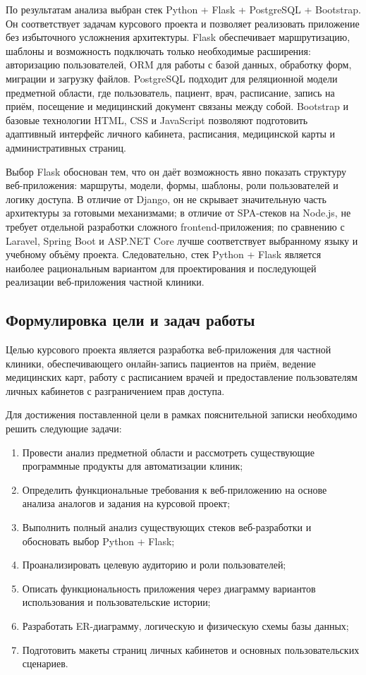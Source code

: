 По результатам анализа выбран стек Python + Flask + PostgreSQL + Bootstrap. Он соответствует задачам курсового проекта и позволяет реализовать приложение без избыточного усложнения архитектуры. Flask обеспечивает маршрутизацию, шаблоны и возможность подключать только необходимые расширения: авторизацию пользователей, ORM для работы с базой данных, обработку форм, миграции и загрузку файлов. PostgreSQL подходит для реляционной модели предметной области, где пользователь, пациент, врач, расписание, запись на приём, посещение и медицинский документ связаны между собой. Bootstrap и базовые технологии HTML, CSS и JavaScript позволяют подготовить адаптивный интерфейс личного кабинета, расписания, медицинской карты и административных страниц.

Выбор Flask обоснован тем, что он даёт возможность явно показать структуру веб-приложения: маршруты, модели, формы, шаблоны, роли пользователей и логику доступа. В отличие от Django, он не скрывает значительную часть архитектуры за готовыми механизмами; в отличие от SPA-стеков на Node.js, не требует отдельной разработки сложного frontend-приложения; по сравнению с Laravel, Spring Boot и ASP.NET Core лучше соответствует выбранному языку и учебному объёму проекта. Следовательно, стек Python + Flask является наиболее рациональным вариантом для проектирования и последующей реализации веб-приложения частной клиники.

\subsection{Формулировка цели и задач работы}

Целью курсового проекта является разработка веб-приложения для частной клиники, обеспечивающего онлайн-запись пациентов на приём, ведение медицинских карт, работу с расписанием врачей и предоставление пользователям личных кабинетов с разграничением прав доступа.

Для достижения поставленной цели в рамках пояснительной записки необходимо решить следующие задачи:

\begin{enumerate}
\item Провести анализ предметной области и рассмотреть существующие программные продукты для автоматизации клиник;
\item Определить функциональные требования к веб-приложению на основе анализа аналогов и задания на курсовой проект;
\item Выполнить полный анализ существующих стеков веб-разработки и обосновать выбор Python + Flask;
\item Проанализировать целевую аудиторию и роли пользователей;
\item Описать функциональность приложения через диаграмму вариантов использования и пользовательские истории;
\item Разработать ER-диаграмму, логическую и физическую схемы базы данных;
\item Подготовить макеты страниц личных кабинетов и основных пользовательских сценариев.
\end{enumerate}

